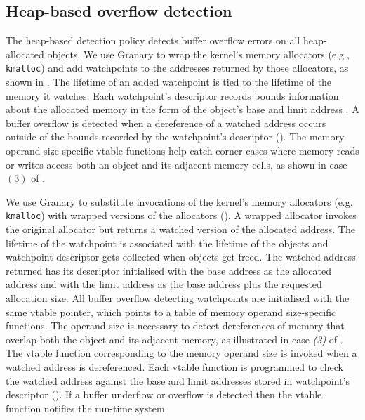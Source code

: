 \subsection{Heap-based overflow detection\label{sec:heap_overflow}}
The heap-based detection policy detects buffer overflow errors on all heap-allocated objects. We use Granary to wrap the kernel's memory allocators (e.g., \texttt{kmalloc}) and add watchpoints to the addresses returned by those allocators, as shown in . The lifetime of an added watchpoint is tied to the lifetime of the memory it watches. Each watchpoint's descriptor records bounds information about the allocated memory in the form of the object's base and limit address \cite{BccFatPointers}. A buffer overflow is detected when a dereference of a watched address occurs outside of the bounds recorded by the watchpoint's descriptor (). 
The memory operand-size-specific vtable functions help catch corner cases where memory reads or writes access both an object and its adjacent memory cells, as shown in case $(3)$ of .

We use Granary to substitute invocations of the kernel's memory allocators (e.g. \texttt{kmalloc}) with wrapped versions of the allocators (). A wrapped allocator invokes the original allocator but returns a watched version of the allocated address. The lifetime of the watchpoint is associated with the lifetime of the objects and watchpoint descriptor gets collected when objects get freed. 
The watched address returned has its descriptor initialised with the base address as the allocated address and with the limit address as the base address plus the requested allocation size. All buffer overflow detecting watchpoints are initialised with the same vtable pointer, which points to a table of memory operand size-specific functions. The operand size is necessary to detect dereferences of memory that overlap both the object and its adjacent memory, as illustrated in case \emph{(3)} of . The vtable function corresponding to the memory operand size is invoked when a watched address is dereferenced. Each vtable function is programmed to check the watched address against the base and limit addresses stored in watchpoint's descriptor (). If a buffer underflow or overflow is detected then the vtable function notifies the run-time system.

